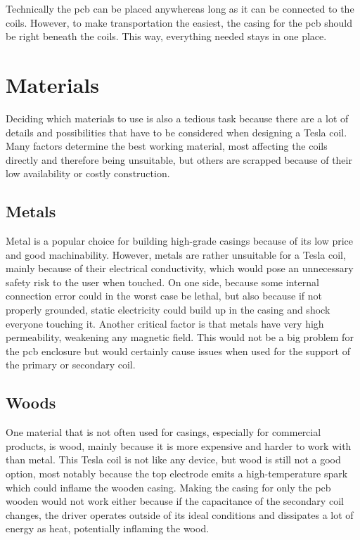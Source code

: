 Technically the \gls{pcb} can be placed anywhereas long as it can be connected to the coils. However, to make transportation the easiest, the casing for the \gls{pcb} should be right beneath the coils. This way, everything needed stays in one place. 

\section{Materials}

Deciding which materials to use is also a tedious task because there are a lot of details and possibilities that have to be considered when designing a Tesla coil. Many factors determine the best working material, most affecting the coils directly and therefore being unsuitable, but others are scrapped because of their low availability or costly construction.

\subsection{Metals}
\label{subsec:materials-metals}

Metal is a popular choice for building high-grade casings because of its low price and good machinability. However, metals are rather unsuitable for a Tesla coil, mainly because of their electrical conductivity, which would pose an unnecessary safety risk to the user when touched. On one side, because some internal connection error could in the worst case be lethal, but also because if not properly grounded, static electricity could build up in the casing and shock everyone touching it. Another critical factor is that metals have very high permeability, weakening any magnetic field. This would not be a big problem for the \gls{pcb} enclosure but would certainly cause issues when used for the support of the primary or secondary coil.

\subsection{Woods}

One material that is not often used for casings, especially for commercial products, is wood, mainly because it is more expensive and harder to work with than metal. This Tesla coil is not like any device, but wood is still not a good option, most notably because the top electrode emits a high-temperature spark which could inflame the wooden casing. Making the casing for only the \gls{pcb} wooden would not work either because if the capacitance of the secondary coil changes, the driver operates outside of its ideal conditions and dissipates a lot of energy as heat, potentially inflaming the wood.

